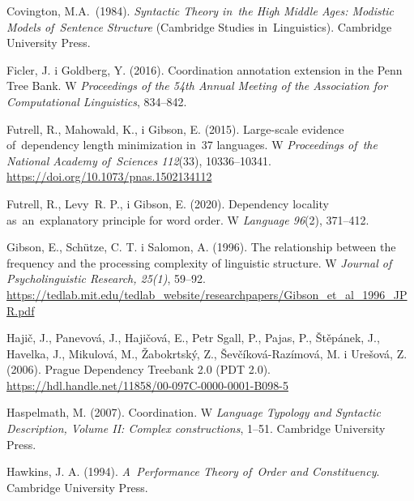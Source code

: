 \documentclass[licencjacka]{pracamgr_Kogni}
\begin{document}
    \begin{thebibliography}{99}
        Covington, M.A.\ (1984). \textit{Syntactic Theory in~the High Middle Ages: Modistic Models of~Sentence Structure}
        (Cambridge Studies in~Linguistics).
        Cambridge University Press.

        Ficler, J. i Goldberg, Y. (2016).
        Coordination annotation extension in the Penn Tree Bank. W \textit{Proceedings of the 54th Annual Meeting of the Association for Computational Linguistics}, 834--842.

        Futrell, R., Mahowald, K., i Gibson, E. (2015).
        Large-scale evidence of~dependency length minimization in~37 languages.
        W \textit{Proceedings of~the National Academy of~Sciences 112}(33), 10336–10341. \url{https://doi.org/10.1073/pnas.1502134112}

        Futrell, R., Levy~R. P., i Gibson, E. (2020).
        Dependency locality as~an~explanatory principle for word order.
        W \textit{Language 96}(2), 371–412.

        Gibson, E., Schütze, C. T. i Salomon, A. (1996). The relationship between the frequency and the processing complexity of linguistic structure. W \textit{Journal of Psycholinguistic Research, 25(1)}, 59--92. \url{https://tedlab.mit.edu/tedlab_website/researchpapers/Gibson_et_al_1996_JPR.pdf}

        Hajič, J., Panevová, J., Hajičová, E., Petr Sgall, P., Pajas, P., Štěpánek, J., Havelka, J., Mikulová, M., Žabokrtský, Z., Ševčíková-Razímová, M. i Urešová, Z. (2006).
        Prague Dependency Treebank 2.0 (PDT 2.0). \url{https://hdl.handle.net/11858/00-097C-0000-0001-B098-5}

        Haspelmath, M. (2007).
        Coordination.
        W \textit{Language Typology and Syntactic Description, Volume II: Complex constructions}, 1–51.
        Cambridge University Press.

        Hawkins, J. A. (1994). \textit{A~Performance Theory of~Order and Constituency}.
        Cambridge University Press.


\end{thebibliography}
\end{document}

